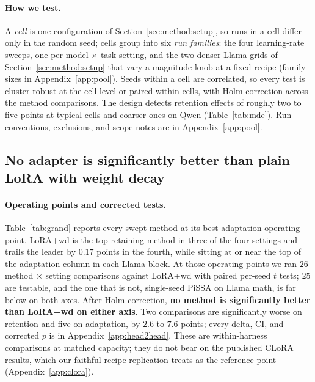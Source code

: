 \documentclass[11pt]{article}
\begin{document}
\paragraph{How we test.} A \emph{cell} is one configuration of
Section~\ref{sec:method:setup}, so runs in a cell differ only in the random
seed; cells group into six \emph{run families}: the four learning-rate
sweeps, one per model $\times$ task setting, and the two denser Llama grids
of Section~\ref{sec:method:setup} that vary a magnitude knob at a fixed
recipe (family sizes in Appendix~\ref{app:pool}).
Seeds within a cell are correlated, so every test is cluster-robust at the
cell level or paired within cells, with Holm correction across the method
comparisons. The design detects retention effects of roughly two to five
points at typical cells and coarser ones on Qwen (Table~\ref{tab:mde}).
Run conventions, exclusions, and scope notes are in
Appendix~\ref{app:pool}.

\subsection{No adapter is significantly better than plain LoRA with weight decay}\label{sec:results:rq1}

\paragraph{Operating points and corrected tests.} Table~\ref{tab:grand} reports
every swept method at its best-adaptation operating point. LoRA{+}wd is the top-retaining method in
three of the four settings and trails the leader by $0.17$ points in the
fourth, while sitting at or near the top of the adaptation column in each
Llama block. At those operating points we ran $26$ method $\times$ setting
comparisons against LoRA{+}wd with paired per-seed $t$ tests; $25$ are
testable, and the one that is not, single-seed PiSSA on Llama math, is far
below on both axes. After Holm correction,
\textbf{no method is significantly better than LoRA{+}wd on either axis}.
Two comparisons are significantly worse on retention and five on
adaptation, by $2.6$ to $7.6$ points; every delta, CI, and corrected $p$ is
in Appendix~\ref{app:head2head}. These are within-harness comparisons at
matched capacity; they do not bear on the published CLoRA results, which
our faithful-recipe replication treats as the reference point
(Appendix~\ref{app:clora}).
\end{document}
